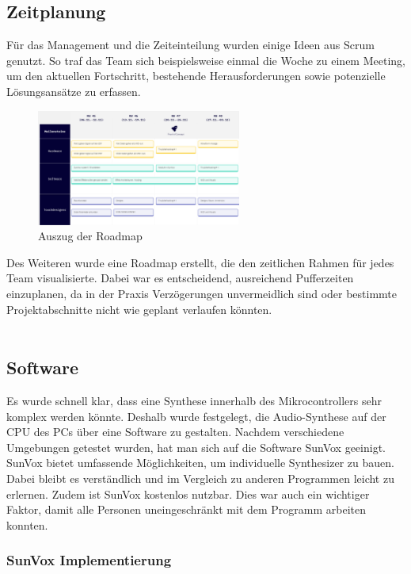 \documentclass[12pt]{scrartcl}%
\theoremstyle{nonumberplain}
\begin{document}
\subsection{Zeitplanung}

Für das Management und die Zeiteinteilung wurden einige Ideen aus Scrum genutzt. So traf das Team sich beispielsweise einmal die Woche zu einem Meeting, um den aktuellen Fortschritt, bestehende Herausforderungen sowie potenzielle Lösungsansätze zu erfassen.
\begin{figure}
  \centering
  \includegraphics[width=0.6\textwidth]{road1}
  \caption{Auszug der Roadmap}
\end{figure}

\noindent Des Weiteren wurde eine Roadmap erstellt, die den zeitlichen Rahmen für jedes Team visualisierte. Dabei war es entscheidend, ausreichend Pufferzeiten einzuplanen, da in der Praxis Verzögerungen unvermeidlich sind oder bestimmte Projektabschnitte nicht wie geplant verlaufen könnten.
\\\\

\newpage

\subsection{Software}

Es wurde schnell klar, dass eine Synthese innerhalb des Mikrocontrollers sehr komplex werden könnte. Deshalb wurde festgelegt, die Audio-Synthese auf der CPU des PCs über eine Software zu gestalten. Nachdem verschiedene Umgebungen getestet wurden, hat man sich auf die Software SunVox geeinigt.\\
SunVox bietet umfassende Möglichkeiten, um individuelle Synthesizer zu bauen. Dabei bleibt es verständlich und im Vergleich zu anderen Programmen leicht zu erlernen. Zudem ist SunVox kostenlos nutzbar. Dies war auch ein wichtiger Faktor, damit alle Personen uneingeschränkt mit dem Programm arbeiten konnten.

\subsubsection{SunVox Implementierung}
\end{document}
